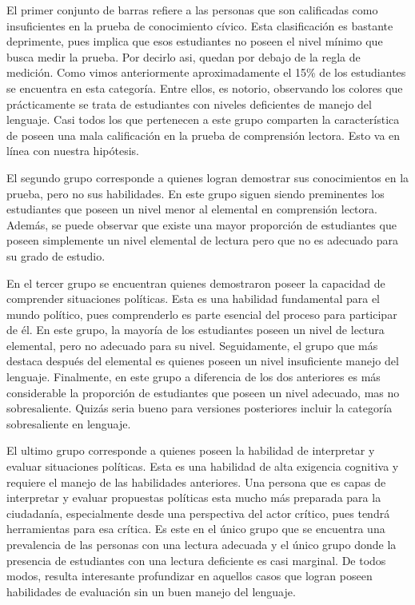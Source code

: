 \documentclass[12pt,twoside]{templates/facsothesis}
\begin{document}
El primer conjunto de barras refiere a las personas que son calificadas como insuficientes en la prueba de conocimiento cívico. Esta clasificación es bastante deprimente, pues implica que esos estudiantes no poseen el nivel mínimo que busca medir la prueba. Por decirlo asi, quedan por debajo de la regla de medición. Como vimos anteriormente aproximadamente el 15\% de los estudiantes se encuentra en esta categoría. Entre ellos, es notorio, observando los colores que prácticamente se trata de estudiantes con niveles deficientes de manejo del lenguaje. Casi todos los que pertenecen a este grupo comparten la característica de poseen una mala calificación en la prueba de comprensión lectora. Esto va en línea con nuestra hipótesis.

El segundo grupo corresponde a quienes logran demostrar sus conocimientos en la prueba, pero no sus habilidades. En este grupo siguen siendo preminentes los estudiantes que poseen un nivel menor al elemental en comprensión lectora. Además, se puede observar que existe una mayor proporción de estudiantes que poseen simplemente un nivel elemental de lectura pero que no es adecuado para su grado de estudio.

En el tercer grupo se encuentran quienes demostraron poseer la capacidad de comprender situaciones políticas. Esta es una habilidad fundamental para el mundo político, pues comprenderlo es parte esencial del proceso para participar de él. En este grupo, la mayoría de los estudiantes poseen un nivel de lectura elemental, pero no adecuado para su nivel. Seguidamente, el grupo que más destaca después del elemental es quienes poseen un nivel insuficiente manejo del lenguaje. Finalmente, en este grupo a diferencia de los dos anteriores es más considerable la proporción de estudiantes que poseen un nivel adecuado, mas no sobresaliente. Quizás seria bueno para versiones posteriores incluir la categoría sobresaliente en lenguaje.

El ultimo grupo corresponde a quienes poseen la habilidad de interpretar y evaluar situaciones políticas. Esta es una habilidad de alta exigencia cognitiva y requiere el manejo de las habilidades anteriores. Una persona que es capas de interpretar y evaluar propuestas políticas esta mucho más preparada para la ciudadanía, especialmente desde una perspectiva del actor crítico, pues tendrá herramientas para esa crítica. Es este en el único grupo que se encuentra una prevalencia de las personas con una lectura adecuada y el único grupo donde la presencia de estudiantes con una lectura deficiente es casi marginal. De todos modos, resulta interesante profundizar en aquellos casos que logran poseen habilidades de evaluación sin un buen manejo del lenguaje.
\end{document}
